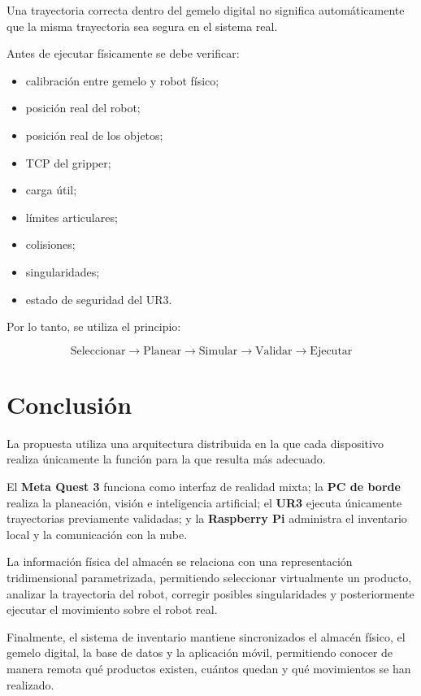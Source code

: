 \documentclass[12pt,letterpaper]{article}
\begin{document}
Una trayectoria correcta dentro del gemelo digital no significa
automáticamente que la misma trayectoria sea segura en el sistema real.

Antes de ejecutar físicamente se debe verificar:

\begin{itemize}[leftmargin=1.2cm]

    \item calibración entre gemelo y robot físico;
    \item posición real del robot;
    \item posición real de los objetos;
    \item TCP del gripper;
    \item carga útil;
    \item límites articulares;
    \item colisiones;
    \item singularidades;
    \item estado de seguridad del UR3.

\end{itemize}

Por lo tanto, se utiliza el principio:

\[
\boxed{
\text{Seleccionar}
\rightarrow
\text{Planear}
\rightarrow
\text{Simular}
\rightarrow
\text{Validar}
\rightarrow
\text{Ejecutar}
}
\]

\section{Conclusión}

La propuesta utiliza una arquitectura distribuida en la que cada
dispositivo realiza únicamente la función para la que resulta más
adecuado.

El \textbf{Meta Quest 3} funciona como interfaz de realidad mixta;
la \textbf{PC de borde} realiza la planeación, visión e inteligencia
artificial; el \textbf{UR3} ejecuta únicamente trayectorias previamente
validadas; y la \textbf{Raspberry Pi} administra el inventario local y
la comunicación con la nube.

La información física del almacén se relaciona con una representación
tridimensional parametrizada, permitiendo seleccionar virtualmente un
producto, analizar la trayectoria del robot, corregir posibles
singularidades y posteriormente ejecutar el movimiento sobre el robot
real.

Finalmente, el sistema de inventario mantiene sincronizados el
almacén físico, el gemelo digital, la base de datos y la aplicación
móvil, permitiendo conocer de manera remota qué productos existen,
cuántos quedan y qué movimientos se han realizado.
\end{document}

